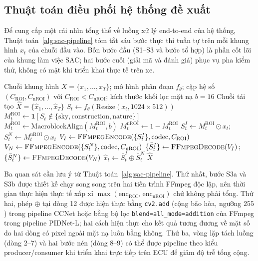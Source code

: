 \subsection{Thuật toán điều phối hệ thống đề xuất}
\label{subsec:thuat-toan-sac}

Để cung cấp một cái nhìn tổng thể về luồng xử lý end-to-end của hệ thống, Thuật toán~\ref{alg:sac-pipeline} tóm tắt sáu bước thực thi tuần tự trên mỗi khung hình $x_t$ của chuỗi đầu vào. Bốn bước đầu (S1--S3 và bước tổ hợp) là phần cốt lõi của khung làm việc SAC; hai bước cuối (giải mã và đánh giá) phục vụ pha kiểm thử, không có mặt khi triển khai thực tế trên xe.

\begin{algorithm}[H]
\caption{Mã hóa nhận thức ngữ nghĩa SAC end-to-end}
\label{alg:sac-pipeline}
\begin{algorithmic}[1]
\Require Chuỗi khung hình $X = \{x_1, \dots, x_T\}$; mô hình phân đoạn $f_\theta$; cặp hệ số $(C_\mathrm{ROI}, C_\mathrm{nROI})$ với $C_\mathrm{ROI} < C_\mathrm{nROI}$; kích thước khối lọc mặt nạ $b = 16$
\Ensure Chuỗi tái tạo $\hat{X} = \{\hat{x}_1, \dots, \hat{x}_T\}$
  \State $S_t \leftarrow f_\theta(\text{Resize}(x_t, 1024\times 512))$ 
  \State $M_t^\mathrm{ROI} \leftarrow \mathbf{1}[S_t \notin \{\text{sky}, \text{construction}, \text{nature}\}]$
  \State $M_t^\mathrm{ROI} \leftarrow \text{MacroblockAlign}(M_t^\mathrm{ROI}, b)$ 
  \State $M_t^\mathrm{nROI} \leftarrow 1 - M_t^\mathrm{ROI}$
  \State $S_t^I \leftarrow M_t^\mathrm{ROI} \odot x_t$;\quad $S_t^N \leftarrow M_t^\mathrm{nROI} \odot x_t$ 
\EndFor
\State $V_I \leftarrow \textsc{FFmpegEncode}(\{S_t^I\}, \text{codec}, C_\mathrm{ROI})$ 
\State $V_N \leftarrow \textsc{FFmpegEncode}(\{S_t^N\}, \text{codec}, C_\mathrm{nROI})$ 
\State $\{\bar{S}_t^I\} \leftarrow \textsc{FFmpegDecode}(V_I)$;\quad $\{\bar{S}_t^N\} \leftarrow \textsc{FFmpegDecode}(V_N)$
  \State $\hat{x}_t \leftarrow \bar{S}_t^I \oplus \bar{S}_t^N$ 
\EndFor
\State \Return $\hat{X}$
\end{algorithmic}
\end{algorithm}

Ba quan sát cần lưu ý từ Thuật toán~\ref{alg:sac-pipeline}. Thứ nhất, bước S3a và S3b được thiết kế chạy song song trên hai tiến trình FFmpeg độc lập, nên thời gian thực hiện thực tế xấp xỉ $\max(\text{enc}_\mathrm{ROI},\,\text{enc}_\mathrm{nROI})$ chứ không phải tổng. Thứ hai, phép $\oplus$ tại dòng 12 được hiện thực bằng \texttt{cv2.add} (cộng bão hòa, ngưỡng $255$) trong pipeline CCNet hoặc bằng bộ lọc \texttt{blend=all\_mode=addition} của FFmpeg trong pipeline PIDNet-L; hai cách hiện thực cho kết quả tương đương về mặt số do hai dòng có pixel ngoài mặt nạ luôn bằng không. Thứ ba, vòng lặp tách luồng (dòng 2--7) và hai bước nén (dòng 8--9) có thể được pipeline theo kiểu producer/consumer khi triển khai trực tiếp trên ECU để giảm độ trễ tổng cộng.


